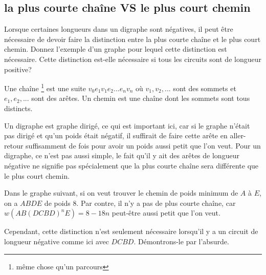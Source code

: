 \subsection{la plus courte chaîne VS le plus court chemin} Lorsque certaines longueurs dans un digraphe sont négatives, il peut être nécessaire de devoir faire la distinction entre la plus courte chaîne et le plus court chemin. Donnez l'exemple d'un graphe pour lequel cette distinction est nécessaire. Cette distinction est-elle nécessaire si tous les circuits sont de longueur positive?
\begin{solution}
Une chaîne \footnote{même chose qu'un parcours} est une suite $v_0e_1v_1e_2...e_nv_n $ où $v_1,v_2,...$ sont des sommets et $e_1,e_2,...$ sont des arêtes.  Un chemin est une chaîne dont les sommets sont tous distincts.

Un digraphe est graphe dirigé, ce qui est important ici, car si le graphe n'était pas dirigé et qu'un poids
était négatif, il suffirait de faire cette arête en aller-retour suffisamment de fois pour avoir un poids aussi petit que l'on veut.
Pour un digraphe, ce n'est pas aussi simple, le fait qu'il y ait des arêtes de longueur négative ne signifie pas spécialement que la plus courte chaîne sera différente que le plus court chemin.

  Dans le graphe suivant, si on veut trouver le chemin de poids minimum de $A$ à $E$, on a $ABDE$ de poids $8$.
  Par contre, il n'y a pas de plus courte chaîne, car $w(AB(DCBD)^nE) = 8 - 18n$ peut-être aussi petit que l'on veut.

  \begin{center}
  \end{center}

  Cependant, cette distinction n'est seulement nécessaire lorsqu'il y a
  un circuit de longueur négative comme ici avec $DCBD$.
  Démontrons-le par l'absurde.


\end{solution}

